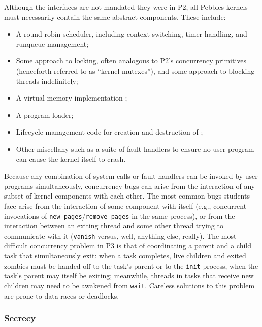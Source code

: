 Although the interfaces are not mandated  they were in P2, all Pebbles kernels must necessarily contain the same abstract components. These include:
\begin{itemize}
	\item A round-robin scheduler, including context switching, timer handling, and runqueue management;
	\item Some approach to locking, often analogous to P2's concurrency primitives (henceforth referred to as ``kernel mutexes''),
		and some approach to blocking threads indefinitely;
	\item A virtual memory implementation ;
	\item A program loader;
	\item Lifecycle management code for creation and destruction of ;
	\item Other miscellany such as a suite of fault handlers to ensure no user program can cause the kernel itself to crash.
\end{itemize}
Because any combination of system calls or fault handlers can be invoked by user programs simultaneously,
concurrency bugs can arise from the interaction of any subset of kernel components with each other.
The most common bugs students face arise from the interaction of some component with itself (e.g., concurrent invocations of {\tt new\_pages}/{\tt remove\_pages} in the same process),
or from the interaction between an exiting thread and some other thread trying to communicate with it ({\tt vanish} versus, well, anything else, really).
The most difficult concurrency problem in P3 is that of coordinating a parent and a child task that simultaneously exit:
when a task completes, live children and exited zombies must be handed off to the task's parent or to the {\tt init} process,
when the task's parent may itself be exiting;
meanwhile, threads in tasks that receive new children may need to be awakened from {\tt wait}.
Careless solutions to this problem are prone to data races or deadlocks.


\subsubsection{Secrecy}
\label{sec:410-secrecy}

